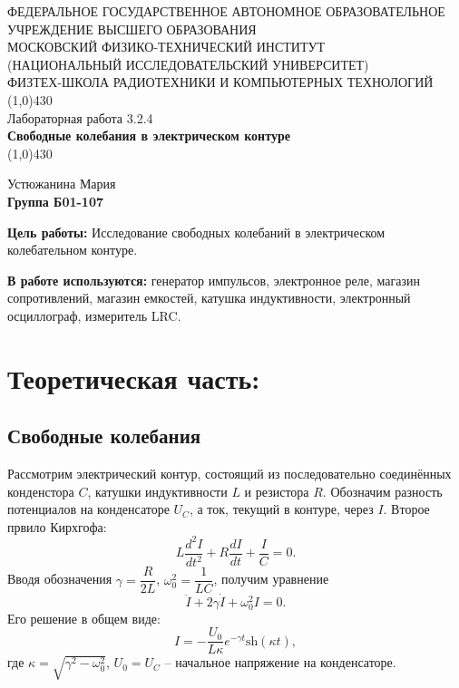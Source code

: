 \documentclass[11pt]{article}
\begin{document}
\begin{titlepage}
\begin{center}
\large{\small ФЕДЕРАЛЬНОЕ ГОСУДАРСТВЕННОЕ АВТОНОМНОЕ ОБРАЗОВАТЕЛЬНОЕ\\ УЧРЕЖДЕНИЕ ВЫСШЕГО ОБРАЗОВАНИЯ\\ МОСКОВСКИЙ ФИЗИКО-ТЕХНИЧЕСКИЙ ИНСТИТУТ\\ (НАЦИОНАЛЬНЫЙ ИССЛЕДОВАТЕЛЬСКИЙ УНИВЕРСИТЕТ)\\ ФИЗТЕХ-ШКОЛА РАДИОТЕХНИКИ И КОМПЬЮТЕРНЫХ ТЕХНОЛОГИЙ}
\vfill
\line(1,0){430}\\[1mm]
\huge{Лабораторная работа 3.2.4}\\
\huge\textbf{Свободные колебания в электрическом контуре}\\
\line(1,0){430}\\[1mm]
\vfill
\begin{flushright}
\normalsize{Устюжанина Мария}\\
\normalsize{\textbf{Группа Б01-107}}\\
\end{flushright}
\end{center}
\end{titlepage}

\par \textbf{Цель работы:} Исследование свободных колебаний в электрическом колебательном контуре.

\par \textbf{В работе используются:} генератор импульсов, электронное реле, магазин сопротивлений, магазин емкостей, катушка индуктивности, электронный осциллограф, измеритель LRC. 


\section{Теоретическая часть:} 

\subsection*{Свободные колебания}
Рассмотрим электрический контур, состоящий из последовательно соединённых конденстора $C$, катушки индуктивности $L$ и резистора $R$. Обозначим разность потенциалов на конденсаторе $U_C$, а ток, текущий в контуре, через $I$. Второе првило Кирхгофа:
\begin{equation}
L \dfrac{d^2I}{dt^2}+R\dfrac{dI}{dt}+\dfrac{I}{C}=0.
\end{equation}
Вводя обозначения $\gamma = \dfrac{R}{2L}$, $\omega_0^2=\dfrac{1}{LC}$, получим уравнение
\begin{equation}
\ddot{I}+2\gamma\dot{I}+\omega_0^2I=0.
\end{equation}
Его решение в общем виде:
\begin{equation}
I = -\dfrac{U_0}{L\kappa}e^{-\gamma t}\text{sh}(\kappa t), 
\end{equation}
где $\kappa = \sqrt{\gamma^2 - \omega_0^2}$, $U_0 = U_C$ -- начальное напряжение на конденсаторе.
\end{document}
